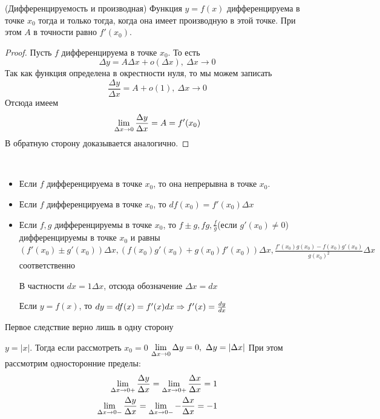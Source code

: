 \begin{theorem}
	(Дифференцируемость и производная) Функция $y = f(x)$ дифференцируема в точке $x_0$ тогда и только тогда, когда она имеет производную в этой точке. При этом $A$ в точности равно $f'(x_0)$.
\end{theorem}

\begin{proof}
	Пусть $f$ дифференцируема в точке $x_0$. То есть
	\[
	\Delta y = A \Delta x + o(\Delta x),\ \Delta x \to 0
	\]
	Так как функция определена в окрестности нуля, то мы можем записать
	\[
	\frac{\Delta y}{\Delta x} = A + o(1),\ \Delta x \to 0
	\]
	Отсюда имеем
	\[
	\lim\limits_{\Delta x \to 0} \frac{\Delta y}{\Delta x} = A = f'(x_0)
	\]
	В обратную сторону доказывается аналогично.
\end{proof}

\begin{corollary}~
	\begin{itemize}
		\item Если $f$ дифференцируема в точке $x_0$, то она непрерывна в точке $x_0$.
		
		\item Если $f$ дифференцируема в точке $x_0$, то $df(x_0) = f'(x_0) \Delta x$
		
		\item Если $f, g$ дифференцируемы в точке $x_0$, то $f \pm g, fg, \frac{f}{g}$(если $g'(x_0) \neq 0$) дифференцируемы в точке $x_0$ и равны $(f'(x_0) \pm g'(x_0))\Delta x, (f(x_0)g'(x_0) + g(x_0)f'(x_0))\Delta x, \frac{f'(x_0)g(x_0) - f(x_0)g'(x_0)}{g(x_0)^2}\Delta x$ соответственно
		
		В частности $dx = 1 \Delta x$, отсюда обозначение $\Delta x = dx$
		
		Если $y = f(x)$, то $dy = df(x) = f'(x)dx \Rightarrow f'(x) = \frac{dy}{dx}$
	\end{itemize}
\end{corollary}

\begin{note}
	Первое следствие верно лишь в одну сторону
\end{note}

\begin{example}
	$y = |x|$. Тогда если рассмотреть $x_0 = 0$
	$\lim\limits_{\Delta x \to 0} \Delta y = 0,\ \Delta y = |\Delta x|$
	При этом рассмотрим односторонние пределы:
	\begin{align*}
		\lim\limits_{\Delta x \to 0+} \frac{\Delta y}{\Delta x} = \lim\limits_{\Delta x \to 0+} \frac{\Delta x}{\Delta x} = 1
		\\
		\lim\limits_{\Delta x \to 0-} \frac{\Delta y}{\Delta x} = \lim\limits_{\Delta x \to 0-} -\frac{\Delta x}{\Delta x} = -1
	\end{align*}
\end{example}

